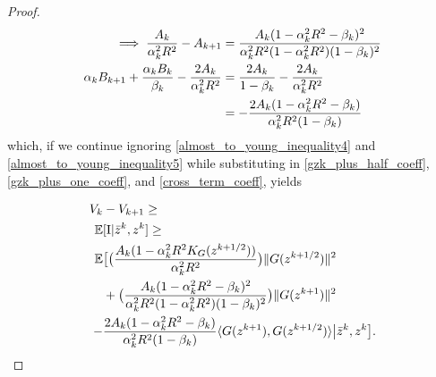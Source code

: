\documentclass[11pt,reqno,oneside]{amsart}
\theoremstyle{definition}
\numberwithin{equation}{section}
\begin{document}
\begin{proof}
\begin{align}
        \implies \frac{A_{k}}{\alpha_{k}^{2}R^{2}} - A_{k+1} & = \frac{A_{k}(1 - \alpha_{k}^{2}R^{2} - \beta_{k})^{2}}{\alpha_{k}^{2}R^{2}(1 - \alpha_{k}^{2}R^{2})(1 - \beta_{k})^{2}} \label{gzk_plus_one_coeff} \\
        \alpha_{k}B_{k+1} + \frac{\alpha_{k}B_{k}}{\beta_{k}} -\frac{2A_{k}}{\alpha_{k}^{2}R^{2}} & = \frac{2A_{k}}{1 - \beta_{k}} -\frac{2A_{k}}{\alpha_{k}^{2}R^{2}} \notag \\
        & = - \frac{2A_{k}(1 - \alpha_{k}^{2}R^{2} - \beta_{k})}{\alpha_{k}^{2}R^{2}(1 - \beta_{k})} \label{cross_term_coeff}
    \end{align}
    which, if we continue ignoring \eqref{almost_to_young_inequality4} and \eqref{almost_to_young_inequality5} while substituting in \eqref{gzk_plus_half_coeff}, \eqref{gzk_plus_one_coeff}, and \eqref{cross_term_coeff}, yields
    
    \begin{align}
        V_{k}& - V_{k+1} \geq \notag \\
        \mathbb{E}&[\text{I}|\bar{z}^{k},z^{k}] \geq \notag \\
        \mathbb{E}&\big{[}\big{(} \frac{A_{k}(1 - \alpha_{k}^{2}R^{2}K_{G}(z^{k+1/2}))}{\alpha_{k}^{2}R^{2}}\big{)}\|G(z^{k + 1/2})\|^{2} \notag \\
        &+ \big{(} \frac{A_{k}(1 - \alpha_{k}^{2}R^{2} - \beta_{k})^{2}}{\alpha_{k}^{2}R^{2}(1 - \alpha_{k}^{2}R^{2})(1 - \beta_{k})^{2}}\big{)}\|G(z^{k+1})\|^{2} \label{two_squared_terms}\\
        -&\frac{2A_{k}(1 - \alpha_{k}^{2}R^{2} -\beta_{k})}{\alpha_{k}^{2}R^{2}(1 - \beta_{k})}\langle G(z^{k+1}),G(z^{k+1/2}) \rangle \big{|} \bar{z}^{k}, z^{k} \big{]}. \label{full_cross_term}
    \end{align}
    

\end{proof}
\end{document}
